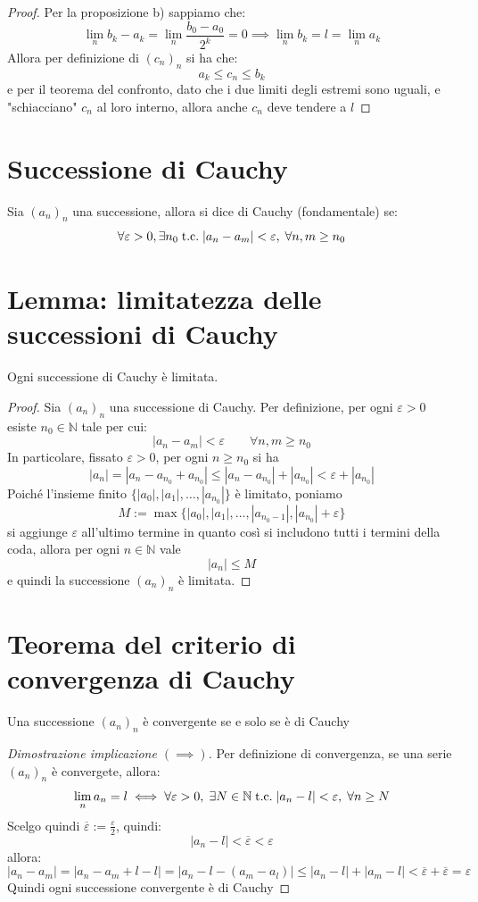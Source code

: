 \documentclass[a4paper,12pt,openright]{book}
\begin{document}
\begin{proof}
		Per la proposizione b) sappiamo che:
		\[\lim_{n} b_k - a_k = \lim_{n} \frac{b_0 - a_0}{2^k} = 0 \implies \lim_{n} b_k = l = \lim_{n} a_k\]
		Allora per definizione di $(c_n)_n$ si ha che:
		\[a_k \leq c_n \leq b_k\]
		e per il teorema del confronto, dato che i due limiti degli estremi sono uguali, e "schiacciano" $c_n$ al loro interno, allora anche $c_n$ deve tendere a $l$ 
	\end{proof}
	
	\section{Successione di Cauchy}
	Sia $(a_n)_n$ una successione, allora si dice di Cauchy (fondamentale) se:
	\[\forall \varepsilon > 0, \exists n_0 \;\text{t.c.}\; |a_n - a_m| < \varepsilon, \; \forall n,m \geq n_0\]
	
	\newpage
	
	\section{Lemma: limitatezza delle successioni di Cauchy}
	Ogni successione di Cauchy è limitata.
	
	\begin{proof}
		Sia $(a_n)_n$ una successione di Cauchy. Per definizione, per ogni $\varepsilon > 0$ esiste $n_0 \in \mathbb{N}$ tale per cui:
		\[|a_n - a_m| < \varepsilon \qquad \forall n,m \ge n_0\]
		In particolare, fissato $\varepsilon > 0$, per ogni $n \ge n_0$ si ha
		\[|a_n| = |a_n - a_{n_0} + a_{n_0}| \le |a_n - a_{n_0}| + |a_{n_0}| < \varepsilon + |a_{n_0}|\]
		Poiché l'insieme finito $\{|a_0|, |a_1|, \dots, |a_{n_0}|\}$ è limitato, poniamo
		\[M := \max\{|a_0|, |a_1|, \dots, |a_{n_0 - 1}|, |a_{n_0}| + \varepsilon\}\]
		si aggiunge $\varepsilon$ all'ultimo termine in quanto così si includono tutti i termini della coda, allora per ogni $n \in \mathbb{N}$ vale
		\[|a_n| \le M\]
		e quindi la successione $(a_n)_n$ è limitata.
	\end{proof}
	
	\newpage
	
	\section{Teorema del criterio di convergenza di Cauchy}
	Una successione $(a_n)_n$ è convergente se e solo se è di Cauchy
	
	\begin{proof}[Dimostrazione implicazione $(\implies)$]
		Per definizione di convergenza, se una serie $(a_n)_n$ è convergete, allora:
		\[\lim_{n} a_n = l \iff \forall \varepsilon > 0, \; \exists N \in \mathbb{N} \;\text{t.c.}\; |a_n - l| < \varepsilon, \; \forall n \ge N\]
		Scelgo quindi $\overline{\varepsilon} := \frac{\varepsilon}{2}$, quindi:
		\[|a_n - l| < \overline{\varepsilon} < \varepsilon\]
		allora:
		\[|a_n - a_m| = |a_n - a_m + l - l| = |a_n - l - (a_m - a_l)| \le |a_n - l| + |a_m - l| < \overline{\varepsilon} + \overline{\varepsilon} = \varepsilon\]
		Quindi ogni successione convergente è di Cauchy
	\end{proof}
	
\end{document}
